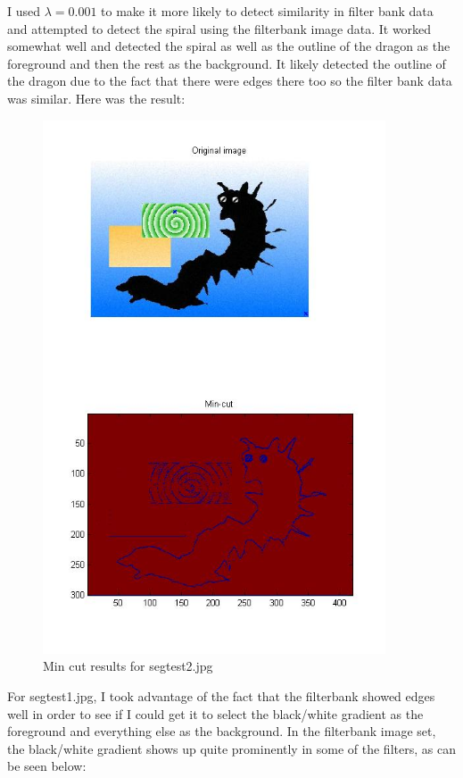 \documentclass[11pt,psfig]{article}
\begin{document}
I used $\lambda=0.001$ to make it more likely to detect similarity in filter bank data and attempted to detect the spiral using the filterbank image data. It worked somewhat well and detected the spiral as well as the outline of the dragon as the foreground and then the rest as the background. It likely detected the outline of the dragon due to the fact that there were edges there too so the filter bank data was similar. Here was the result:

\begin{figure}[H]
\centering
\includegraphics[width=4in]{prob5plotB_1.jpg}
\caption{Min cut results for segtest2.jpg}
\end{figure}

For segtest1.jpg, I took advantage of the fact that the filterbank showed edges well in order to see if I could get it to select the black/white gradient as the foreground and everything else as the background. In the filterbank image set, the black/white gradient shows up quite prominently in some of the filters, as can be seen below:
\end{document}
